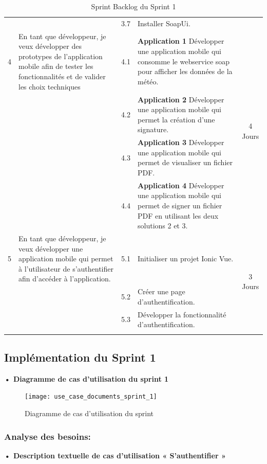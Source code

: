 \begin{adjustwidth}{-1cm}{}
\begin{longtable}{|c|p{6cm}|c|p{6cm}|c|}
    \cline{3-4}
    &  &  3.7 &Installer SoapUi.&\\
    \cline{1-5}
    4 & En tant que développeur, je veux développer des prototypes de l'application mobile afin de tester les fonctionnalités et de valider les choix techniques &  4.1 &\textbf{Application 1} Développer une application mobile qui consomme le webservice soap pour afficher les données de la météo.&\multirow{4}{2cm}{4 Jours}\\
    \cline{3-4}
    &  &  4.2 &\textbf{Application 2} Développer une application mobile qui permet la création d'une signature.&\\
    \cline{3-4}
    &  &  4.3 &\textbf{Application 3} Développer une application mobile qui permet de visualiser un fichier PDF.&\\
    \cline{3-4}
    &  &  4.4 &\textbf{Application 4} Développer une application mobile qui permet de signer un fichier PDF en utilisant les deux solutions 2 et 3.&\\
    \cline{1-5}
    5 & En tant que développeur, je veux développer une application mobile qui permet à l'utilisateur de s'authentifier afin d'accéder à l'application. & 
    
    5.1 &Initialiser un projet Ionic Vue.&\multirow{3}{2cm}{3 Jours}\\
    \cline{3-4}
    &  &  5.2 & Créer une page d'authentification.&\\
    \cline{3-4}
    &  &  5.3 & Développer la fonctionnalité d'authentification.&\\

  \hline

  \caption{Sprint Backlog du Sprint 1}
  \label{tab:sprint-backlog-1}
\end{longtable}
\end{adjustwidth}
\subsection{Implémentation du Sprint 1}
\textbf{•	Diagramme de cas d'utilisation du sprint 1}

\begin{figure}[H]
  \centering
  \texttt{[image: use\_case\_documents\_sprint\_1]}
  \caption{Diagramme de cas d'utilisation du sprint }
  \label{fig:UseCaseDiagram1}
\end{figure}

\subsubsection{Analyse des besoins:}
\textbf{•	Description textuelle de cas d'utilisation « S'authentifier »}

